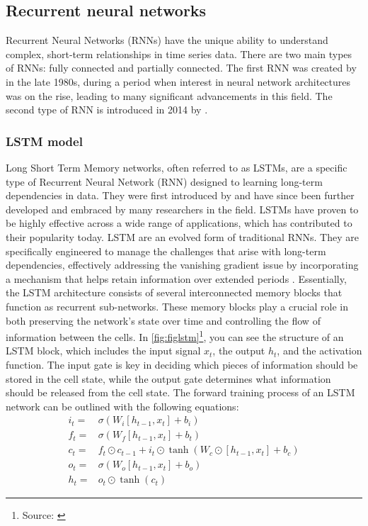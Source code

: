 \documentclass[]{interact}
\theoremstyle{plain}%
\theoremstyle{definition}
\theoremstyle{remark}
\begin{document}
\subsection{Recurrent neural networks}\label{recurrent-neural-networks}

Recurrent Neural Networks (RNNs) have the unique ability to understand
complex, short-term relationships in time series data. There are two
main types of RNNs: fully connected and partially connected. The first
RNN was created by \citep{williams1989} in the late 1980s, during a
period when interest in neural network architectures was on the rise,
leading to many significant advancements in this field. The second type
of RNN is introduced in 2014 by \citep{chung2014}.

\subsubsection{LSTM model}\label{lstm-model}

Long Short Term Memory networks, often referred to as LSTMs, are a
specific type of Recurrent Neural Network (RNN) designed to learning
long-term dependencies in data. They were first introduced by
\citep{hochreiter97} and have since been further developed and embraced
by many researchers in the field. LSTMs have proven to be highly
effective across a wide range of applications, which has contributed to
their popularity today. LSTM are an evolved form of traditional RNNs.
They are specifically engineered to manage the challenges that arise
with long-term dependencies, effectively addressing the vanishing
gradient issue by incorporating a mechanism that helps retain
information over extended periods \citep{hochreiter97}. Essentially, the
LSTM architecture consists of several interconnected memory blocks that
function as recurrent sub-networks. These memory blocks play a crucial
role in both preserving the network's state over time and controlling
the flow of information between the cells. In
\autoref{fig:figlstm}\footnote{Source: \citep{KILIC2023}}, you can see
the structure of an LSTM block, which includes the input signal \(x_t\),
the output \(h_t\), and the activation function. The input gate is key
in deciding which pieces of information should be stored in the cell
state, while the output gate determines what information should be
released from the cell state. The forward training process of an LSTM
network can be outlined with the following equations: \begin{align}
i_t  =  & \sigma\left(W_i [h_{t-1}, x_t]+b_i \right)\\
f_t  = &  \sigma\left(W_f [h_{t-1}, x_t]+b_t \right) \\
c_t  = & f_t \odot c_{t-1}+i_t \odot \tanh\left(W_c \odot [h_{t-1}, x_t] +b_c \right) \\
o_t  = &  \sigma\left(W_o [h_{t-1}, x_t]+b_o \right) \\
h_t  = &  o_t\odot \tanh(c_t)
\end{align} \newline
\end{document}
